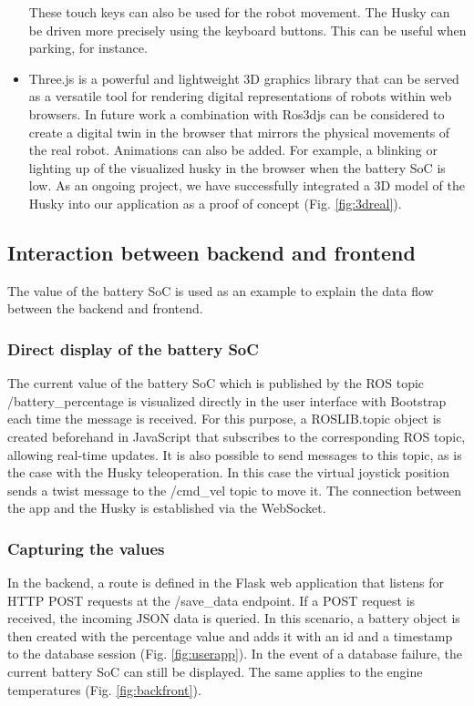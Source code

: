 \documentclass[conference]{IEEEtran}
\begin{document}
\begin{itemize}
These touch keys can also be used for the robot movement. The Husky can be driven more precisely using the keyboard buttons. This can be useful when parking, for instance.
\item Three.js is a powerful and lightweight 3D graphics library that can be served as a versatile tool for rendering digital representations of robots within web browsers. In future work a combination with Ros3djs can be considered to create a digital twin in the browser that mirrors the physical movements of the real robot. Animations can also be added. For example, a blinking or lighting up of the visualized husky in the browser when the battery SoC is low. 
As an ongoing project, we have successfully integrated a 3D model of the Husky into our application as a proof of concept (Fig. \ref{fig:3dreal}).
\end{itemize}

\subsection{Interaction between backend and frontend}
The value of the battery SoC is used as an example to explain the data flow between the backend and frontend. 
\subsubsection{Direct display of the battery SoC}
The current value of the battery SoC which is published by the ROS topic /battery\_percentage is visualized directly in the user interface with Bootstrap each time the message is received. For this purpose, a ROSLIB.topic object is created beforehand in JavaScript that subscribes to the corresponding ROS topic, allowing real-time updates. It is also possible to send messages to this topic, as is the case with the Husky teleoperation. 
In this case the virtual joystick position sends a twist message to the /cmd\_vel topic to move it. 
The connection between the app and the Husky is established via the WebSocket. 
\subsubsection{Capturing the values}
In the backend, a route is defined in the Flask web application that listens for HTTP POST requests at the /save\_data endpoint. If a POST request is received, the incoming JSON data is queried. In this scenario, a battery object is then created with the percentage value and adds it with an id and a timestamp to the database session (Fig. \ref{fig:userapp}). In the event of a database failure, the current battery SoC can still be displayed. The same applies to the engine temperatures (Fig. \ref{fig:backfront}).
\end{document}
